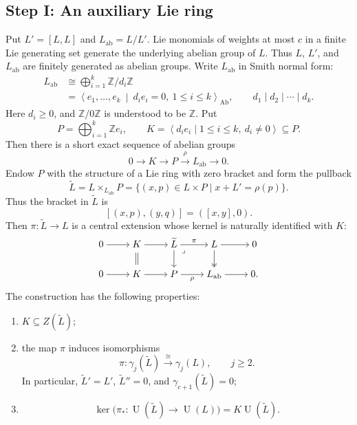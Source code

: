 \documentclass[a4paper,11pt,reqno]{amsart}
\theoremstyle{definition}
\newcommand{\Z}{\mathbb Z}
\newcommand{\U}{\operatorname U}
\newcommand{\ab}{\operatorname{ab}}
\begin{document}
\subsection*{Step I: An auxiliary Lie ring}

Put $L'=[L,L]$ and $L_{\ab}=L/L'$.  Lie monomials of weights at most $c$ in
a finite Lie generating set generate the underlying abelian group of $L$.
Thus $L$, $L'$, and $L_{\ab}$ are finitely generated as abelian groups.
Write $L_{\ab}$ in Smith normal form:
\[
 \begin{aligned}
 L_{\ab}
 &\cong\bigoplus_{i=1}^k\Z/d_i\Z\\
 &=\left\langle e_1,\ldots,e_k\ \middle|\
       d_i e_i=0,\ 1\leq i\leq k\right\rangle_{\mathrm{Ab}},
 \qquad d_1\mid d_2\mid\cdots\mid d_k.
 \end{aligned}
\]
Here $d_i\geq0$, and $\Z/0\Z$ is understood to be $\Z$.  Put
\[
 P=\bigoplus_{i=1}^k\Z e_i,
 \qquad
 K=\left\langle d_i e_i\mid 1\leq i\leq k,\ d_i\neq0\right\rangle
 \subseteq P.
\]
Then there is a short exact sequence of abelian groups
\begin{equation}\label{eq:free-cover}
 0\longrightarrow K\longrightarrow P
  \overset{\rho}{\longrightarrow}L_{\ab}\longrightarrow0.
\end{equation}
Endow $P$ with the structure of a Lie ring with zero bracket and form the
pullback
\[
 \widetilde L=L\times_{L_{\ab}}P
 =\{(x,p)\in L\times P\mid x+L'=\rho(p)\}.
\]
Thus the bracket in $\widetilde L$ is
\[
 [(x,p),(y,q)]=([x,y],0).
\]
Then $\pi:\widetilde L\to L$ is a central extension whose kernel is
naturally identified with $K$:
\[
\begin{tikzcd}[cramped]
 0 & K & {\widetilde L} & L & 0 \\
 0 & K & P & {L_{\ab}} & {0.}
 \arrow[from=1-1, to=1-2]
 \arrow[from=1-2, to=1-3]
 \arrow["{=\mathrel{\mkern-3mu}=}"{marking, allow upside down},
   draw=none, from=1-2, to=2-2]
 \arrow["\pi", from=1-3, to=1-4]
 \arrow[from=1-3, to=2-3]
 \arrow["\lrcorner"{anchor=center, pos=0.125}, draw=none,
   from=1-3, to=2-4]
 \arrow[from=1-4, to=1-5]
 \arrow[two heads, from=1-4, to=2-4]
 \arrow[from=2-1, to=2-2]
 \arrow[from=2-2, to=2-3]
 \arrow["\rho"', from=2-3, to=2-4]
 \arrow[from=2-4, to=2-5]
\end{tikzcd}
\]
The construction has the following properties:
\begin{enumerate}[label=\textup{(\alph*)},ref=\textup{(\alph*)},
                  leftmargin=2em,nosep]
 \item\label{item:cover-central} $K\subseteq Z(\widetilde L)$;
 \item\label{item:cover-lower-central} the map $\pi$ induces isomorphisms
 \[
  \pi:\gamma_j(\widetilde L)\xrightarrow{\;\cong\;}\gamma_j(L),
  \qquad j\geq2.
 \]
 In particular, $\widetilde L'=L'$, $\widetilde L''=0$, and
 $\gamma_{c+1}(\widetilde L)=0$;
 \item\label{item:cover-enveloping-kernel}
 \[
  \ker\bigl(\pi_*:\U(\widetilde L)\longrightarrow\U(L)\bigr)
  =K\U(\widetilde L).
 \]
\end{enumerate}
\end{document}
